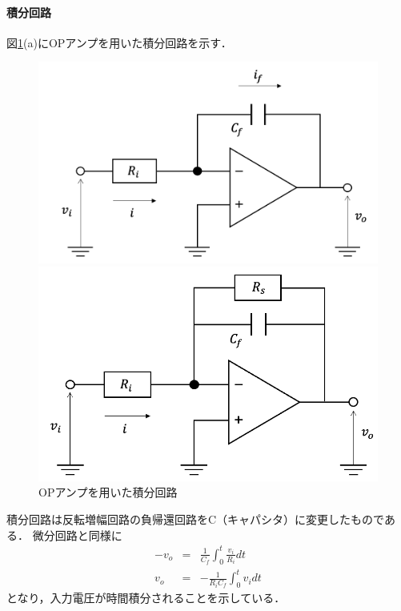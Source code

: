 \documentclass[dvipdfmx,titlepage,a4j]{jsarticle}  %
\begin{document}
\paragraph{積分回路\\}
図\ref{fig:di:case3}(a)にOPアンプを用いた積分回路を示す．
\begin{figure}[H]
  \centering
  \begin{minipage}{8cm}
    \centering
    \includegraphics[keepaspectratio, scale=0.2]{../image/di-case31.png}
  \end{minipage}
  \begin{minipage}{8cm}
    \centering
    \includegraphics[keepaspectratio, scale=0.2]{../image/di-case32.png}
  \end{minipage}
  \caption{OPアンプを用いた積分回路}
  \label{fig:di:case3}
\end{figure}

積分回路は反転増幅回路の負帰還回路をC（キャパシタ）に変更したものである．
微分回路と同様に
\begin{eqnarray}
  -v_o &=& \frac{1}{C_f}\int_0^t \frac{v_i}{R_i}dt\\
  v_o &=& -\frac{1}{R_i C_f}\int_0^t v_idt
\end{eqnarray}
となり，入力電圧が時間積分されることを示している．
\end{document}
